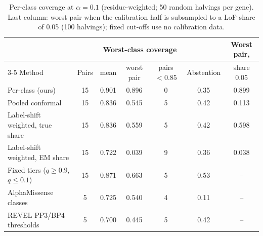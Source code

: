 \begin{table}[t]
\centering
\caption{Per-class coverage at $\alpha=0.1$ (residue-weighted; 50 random halvings per gene). Last column: worst pair
when the calibration half is subsampled to a LoF share of 0.05 (100 halvings); fixed cut-offs use no calibration data.}\label{tab:methods}
\setlength{\tabcolsep}{4pt}
\begin{tabular}{lcccccc}
\toprule
 & & \multicolumn{3}{c}{Worst-class coverage} & & Worst pair,\\
\cmidrule(lr){3-5}
Method & Pairs & mean & worst pair & pairs $<0.85$ & Abstention & share 0.05\\
\midrule
Per-class (ours) & 15 & 0.901 & 0.896 & 0 & 0.35 & 0.899 \\
Pooled conformal & 15 & 0.836 & 0.545 & 5 & 0.42 & 0.113 \\
Label-shift weighted, true share & 15 & 0.836 & 0.559 & 5 & 0.42 & 0.598 \\
Label-shift weighted, EM share & 15 & 0.722 & 0.039 & 9 & 0.36 & 0.038 \\
Fixed tiers ($q\ge0.9$, $q\le0.1$) & 15 & 0.871 & 0.663 & 5 & 0.53 & -- \\
AlphaMissense classes & 5 & 0.725 & 0.540 & 4 & 0.11 & -- \\
REVEL PP3/BP4 thresholds & 5 & 0.700 & 0.445 & 5 & 0.42 & -- \\
\bottomrule
\end{tabular}
\end{table}
